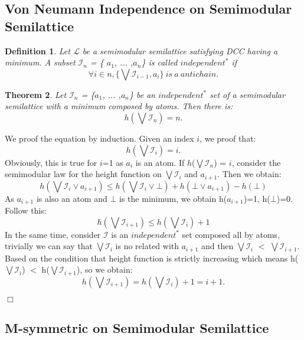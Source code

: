 \documentclass{article}
\newenvironment{proof}{\par \noindent {\bf Proof:}}{\begin{flushright}$\Box$\end{flushright}\par \noindent}
\newtheorem{theorem}{\bf Theorem}
\newtheorem{definition}[theorem]{\bf Definition}
\begin{document}
\subsection{Von Neumann Independence on Semimodular Semilattice}

\begin{definition}
Let $\mathcal{L}$ be a semimodular semilattice satisfying DCC having a minimum. A subset $\mathcal{I}_{n}$ = \{ $a_{1}$, ... ,$a_{n}$\} is called $independent^{*}$ if $$\forall i \in n, \{ \bigvee \mathcal{I}_{i-1}, a_{i} \}\ is\ a\ antichain.$$

\end{definition}

\begin{theorem}
Let $\mathcal{I}_{n}$ = \{$a_{1}$, ... ,$a_{n}$\} be an $independent^{*}$ set of a semimodular semilattice with a minimum composed by atoms. Then there is:$$ h(\bigvee \mathcal{I}_{n})=n. $$
\end{theorem}

\begin{proof}
We proof the equation by induction. Given an index $i$, we proof that: $$ h(\bigvee \mathcal{I}_{i}) = i. $$ Obviously, this is true for $i$=1 as $a_{i}$ is an atom. If $h$($\bigvee$$\mathcal{I}_{n}$) = $i$, consider the semimodular law for the height function on $\bigvee$$\mathcal{I}_{i}$ and $a_{i+1}$. Then we obtain: $$ h(\bigvee \mathcal{I}_{i} \vee a_{i+1}) \leq h(\bigvee \mathcal{I}_{i} \vee \bot) + h(\bot \vee a_{i+1}) - h(\bot)$$ As $a_{i+1}$ is also an atom and $\bot$ is the minimum, we obtain h($a_{i+1}$)=1, h($\bot$)=0. Follow this:$$ h(\bigvee \mathcal{I}_{i+1}) \leq h(\bigvee \mathcal{I}_{i}) + 1$$In the same time, consider $\mathcal{I}$ is an $independent^{*}$ set composed all by atoms, trivially we can say that $\bigvee$$\mathcal{I}_{i}$ is no related with $a_{i+1}$ and then $\bigvee$$\mathcal{I}_{i}$ $<$ $\bigvee$$\mathcal{I}_{i+1}$. Based on the condition that height function is strictly increasing which means h($\bigvee$$\mathcal{I}_{i}$) $<$ h($\bigvee$$\mathcal{I}_{i+1}$), so we obtain: $$ h(\bigvee \mathcal{I}_{i+1}) = h(\bigvee \mathcal{I}_{i}) + 1 = i + 1.$$
\end{proof}

\subsection{M-symmetric on Semimodular Semilattice}
\end{document}
